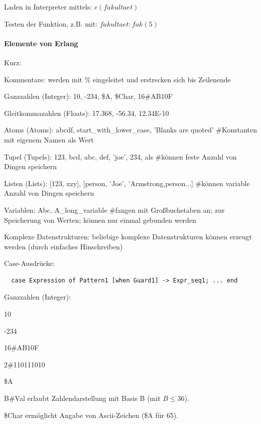 \documentclass[10pt]{article}
\begin{document}
Laden in Interpreter mittels: $c(fakultaet)$

Testen der Funktion, z.B. mit: $fakultaet:fak(5)$

\paragraph{Elemente von Erlang}

Kurz:
\begin{itemize*}
  \item Kommentare: werden mit \% eingeleitet und erstrecken sich bis Zeilenende
  \item Ganzzahlen (Integer): 10, -234, \$A, \$Char, 16\#AB10F
  \item Gleitkommazahlen (Floats): 17.368, -56.34, 12.34E-10
  \item Atoms (Atoms): abcdf, start\_with\_lower\_case, 'Blanks are quoted' \#Konstanten mit eigenem Namen als Wert
  \item Tupel (Tupels): {123, bcd}, {abc, {def, 'joe', 234}, als} \#können feste Anzahl von Dingen speichern
  \item Listen (Lists): [123, xzy], [{person, 'Joe', 'Armstrong},{person...}] \#können variable Anzahl von Dingen speichern
  \item Variablen: Abc, A\_long\_variable \#fangen mit Großbuchstaben an; zur Speicherung von Werten; können nur einmal gebunden werden
  \item Komplexe Datenstrukturen: beliebige komplexe Datenstrukturen können erzeugt werden (durch einfaches Hinschreiben)
  \item Case-Ausdrücke:
  \begin{lstlisting} 
  case Expression of Pattern1 [when Guard1] -> Expr_seq1; ... end 
  \end{lstlisting}
\end{itemize*}

Ganzzahlen (Integer):
\begin{itemize*}
  \item 10
  \item -234
  \item 16\#AB10F
  \item 2\#110111010
  \item \$A
  \item B\#Val erlaubt Zahlendarstellung mit Basis B (mit $B\leq 36$).
  \item \$Char ermöglicht Angabe von Ascii-Zeichen (\$A für 65).
\end{itemize*}
\end{document}
